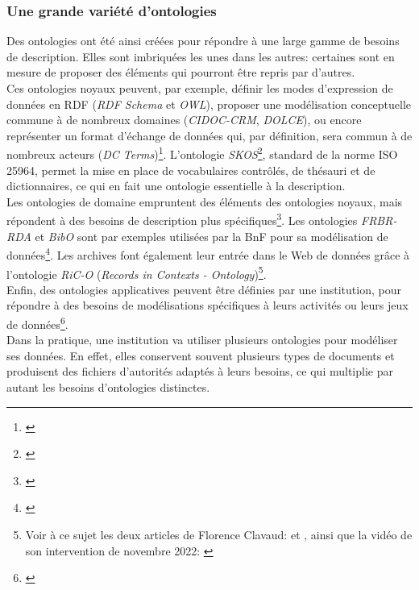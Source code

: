 \documentclass[a4paper,12pt,twoside]{book}
\begin{document}
\subsubsection{Une grande variété d'ontologies}
Des ontologies ont été ainsi créées pour répondre à une large gamme de besoins de description. Elles sont imbriquées les unes dans les autres: certaines sont en mesure de proposer des éléments qui pourront être repris par d'autres.\\

Ces ontologies \og noyaux \fg{} peuvent, par exemple, définir les modes d'expression de données en RDF (\textit{RDF Schema} et \textit{OWL}), proposer une modélisation conceptuelle commune à de nombreux domaines (\textit{CIDOC-CRM}, \textit{DOLCE}), ou encore représenter un format d'échange de données qui, par définition, sera commun à de nombreux acteurs (\textit{DC Terms})\footnote{\cite{isaacReferentielsTypologieInteroperabilite2012}}. L'ontologie \textit{SKOS}\footnote{\cite{worldwidewebconsortiumSKOSSimpleKnowledge2012}}, standard de la norme ISO 25964, permet la mise en place de vocabulaires contrôlés, de thésauri et de dictionnaires, ce qui en fait une ontologie essentielle à la description.\\


Les ontologies \og de domaine \fg{} empruntent des éléments des ontologies noyaux, mais répondent à des besoins de description plus spécifiques\footnote{\cite{isaacReferentielsTypologieInteroperabilite2012}}. Les ontologies \textit{FRBR-RDA} et \textit{BibO} sont par exemples utilisées par la BnF pour sa modélisation de données\footnote{\cite{bibliothequenationaledefranceVocabulairesEmployesBibliotheque2023}}. Les archives font également leur entrée dans le Web de données grâce à l'ontologie \textit{RiC-O} (\textit{Records in Contexts - Ontology})\footnote{Voir à ce sujet les deux articles de Florence Clavaud: \cite{clavaudRepresenterRDFInterconnecter2017} et \cite{clavaudTransformerMetadonneesArchives2019}, ainsi que la vidéo de son intervention de novembre 2022: \cite{clavaudRiCAuxArchives2022}}.\\

Enfin, des ontologies \og applicatives \fg{} peuvent être définies par une institution, pour répondre à des besoins de modélisations spécifiques à leurs activités ou leurs jeux de données\footnote{\cite{isaacReferentielsTypologieInteroperabilite2012}}.\\ 

Dans la pratique, une institution va utiliser plusieurs ontologies pour modéliser ses données. En effet, elles conservent souvent plusieurs types de documents et produisent des fichiers d'autorités adaptés à leurs besoins, ce qui multiplie par autant les besoins d'ontologies distinctes.\\
\end{document}
